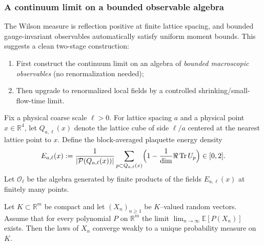 \subsubsection{A continuum limit on a bounded observable algebra}
\label{subsec:bounded_algebra_tightness}

The Wilson measure is reflection positive at finite lattice spacing, and bounded gauge-invariant observables automatically satisfy
uniform moment bounds. This suggests a clean two-stage construction:

\begin{enumerate}[leftmargin=*]
\item First construct the continuum limit on an algebra of \emph{bounded macroscopic observables} (no renormalization needed);
\item Then upgrade to renormalized local fields by a controlled shrinking/small-flow-time limit.
\end{enumerate}

Fix a physical coarse scale $\ell>0$. For lattice spacing $a$ and a physical point $x\in\mathbb R^4$, let $Q_{a,\ell}(x)$ denote
the lattice cube of side $\ell/a$ centered at the nearest lattice point to $x$.
Define the block-averaged plaquette energy density
\begin{equation}\label{eq:block_energy_def}
E_{a,\ell}(x)
:= \frac{1}{|\mathcal P(Q_{a,\ell}(x))|}\sum_{p\subset Q_{a,\ell}(x)}\Bigl(1-\frac{1}{\dim}\Re\,\mathrm{Tr}\, U_p\Bigr)\in[0,2].
\end{equation}
Let $\mathcal O_{\ell}$ be the algebra generated by finite products of the fields $E_{a,\ell}(x)$ at finitely many points.

\begin{lemma}
\label{lem:poly_moments_determine_weak}
Let $K\subset\mathbb R^m$ be compact and let $(X_n)_{n\ge 1}$ be $K$--valued random vectors.
Assume that for every polynomial $P$ on $\mathbb R^m$ the limit $\lim_{n\to\infty}\mathbb E[P(X_n)]$ exists.
Then the laws of $X_n$ converge weakly to a unique probability measure on $K$.
\end{lemma}

